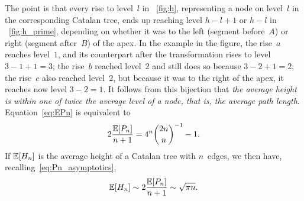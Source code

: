 The point is that every rise to level~\(l\) in \fig~\ref{fig:h},
representing a node on level~\(l\) in the corresponding Catalan tree,
ends up reaching level $h-l+1$ or $h-l$ in \fig~\ref{fig:h_prime},
depending on whether it was to the left (segment before~$A$) or right
(segment after~$B$) of the apex.  In the example in the figure, the
rise~$a$ reaches level~$1$, and its counterpart after the
transformation rises to level \(3-1+1=3\); the rise~$b$ reached
level~$2$ and still does so because \(3-2+1=2\); the rise~$c$ also
reached level~$2$, but because it was to the right of the apex, it
reaches now level \(3-2=1\). It follows from this bijection that
\emph{the average height is within one of twice the average level of a
  node, that is, the average path length}. Equation~\eqref{eq:EPn} is
equivalent to
\begin{equation*}
2\frac{\mathbb{E}[{P_n}]}{n+1} = 4^{n}\binom{2n}{n}^{-1} - 1.
\end{equation*}
If \(\mathbb{E}[{H_n}]\) is the average height of a Catalan tree with
\(n\)~edges, we then have, recalling~\eqref{eq:Pn_asymptotics},
\begin{equation*}
\mathbb{E}[{H_n}] \sim 2\frac{\mathbb{E}[{P_n}]}{n+1} \sim \sqrt{\pi n}.
\end{equation*}


